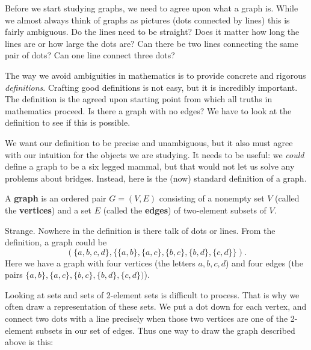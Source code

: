 \documentclass[10pt,]{book}
\newcommand{\terminology}[1]{\textbf{#1}}
\theoremstyle{plain}
\theoremstyle{definition}
\theoremstyle{definition}
\theoremstyle{definition}
\theoremstyle{definition}
\numberwithin{equation}{chapter}
\begin{document}
\hypertarget{p-1476}{}%
Before we start studying graphs, we need to agree upon what a graph is.  		While we almost always think of graphs as pictures (dots connected by lines) this is fairly ambiguous.  Do the lines need to be straight?  Does it matter how long the lines are or how large the dots are?  Can there be two lines connecting the same pair of dots?  Can one line connect three dots?%
\par
\hypertarget{p-1477}{}%
The way we avoid ambiguities in mathematics is to provide concrete and rigorous \emph{definitions}.  Crafting good definitions is not easy, but it is incredibly important.  The definition is the agreed upon starting point from which all truths in mathematics proceed.  Is there a graph with no edges?  We have to look at the definition to see if this is possible.%
\par
\hypertarget{p-1478}{}%
We want our definition to be precise and unambiguous, but it also must agree with our intuition for the objects we are studying.  It needs to be useful: we \emph{could} define a graph to be a six legged mammal, but that would not let us solve any problems about bridges.  Instead, here is the (now) standard definition of a graph.%
\begin{assemblage}\label{assemblage-35}
\hypertarget{p-1479}{}%
A \terminology{graph} is an ordered pair \(G = (V, E)\) consisting of a nonempty set \(V\) (called the \terminology{vertices}) and a set \(E\) (called the \terminology{edges}) of two-element subsets of \(V\).%
\end{assemblage}
\hypertarget{p-1480}{}%
Strange.  Nowhere in the definition is there talk of dots or lines.  From the definition, a graph could be%
\begin{equation*}
(\{a,b,c,d\}, \{\{a,b\}, \{a,c\}, \{b,c\}, \{b,d\}, \{c,d\}\}).
\end{equation*}
Here we have a graph with four vertices  (the letters \(a, b, c, d\)) and four edges (the pairs \(\{a,b\}, \{a,c\}, \{b,c\}, \{b,d\}, \{c,d\})\)).%
\par
\hypertarget{p-1481}{}%
Looking at sets and sets of 2-element sets is difficult to process.  That is why we often draw a representation of these sets.  We put a dot down for each vertex, and connect two dots with a line precisely when those two vertices are one of the 2-element subsets in our set of edges.  Thus one way to draw the graph described above is this:%
\end{document}
